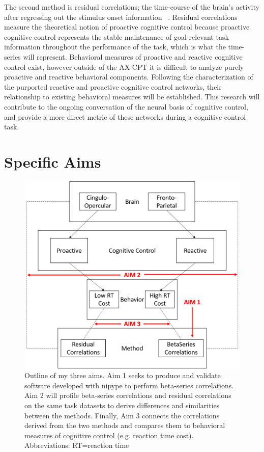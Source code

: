 \documentclass[phd,appendix,figures]{uithesis}
\begin{document}
The second method is residual correlations; the time-course of the brain's activity after regressing out the stimulus onset information ~\citep{Fair2007,Cole2014,Bolt2017}. 
Residual correlations measure the theoretical notion of proactive cognitive control because proactive cognitive control represents the stable maintenance of goal-relevant task information throughout the performance of the task, which is what the time-series will represent.
Behavioral measures of proactive and reactive cognitive control exist, however outside of the AX-CPT it is difficult to analyze purely proactive and reactive behavioral components. 
Following the characterization of the purported reactive and proactive cognitive control networks, their relationship to existing behavioral measures will be established.
This research will contribute to the ongoing conversation of the neural basis of cognitive control, and provide a more direct metric of these networks during a  cognitive control task.

\section{Specific Aims}
\begin{figure}[H]%
	\centering
	\includegraphics[width=1\linewidth]{all_aims}
	\caption{Outline of my three aims. Aim 1 seeks to produce and validate software developed with nipype to perform beta-series correlations. Aim 2 will profile beta-series correlations and residual correlations on the same task datasets to derive differences and similarities between the methods. Finally, Aim 3 connects the correlations derived from the two methods and compares them to behavioral measures of cognitive control (e.g. reaction time cost). Abbreviations: RT=reaction time}
	\label{fig:all_aims}
\end{figure}
\end{document}
